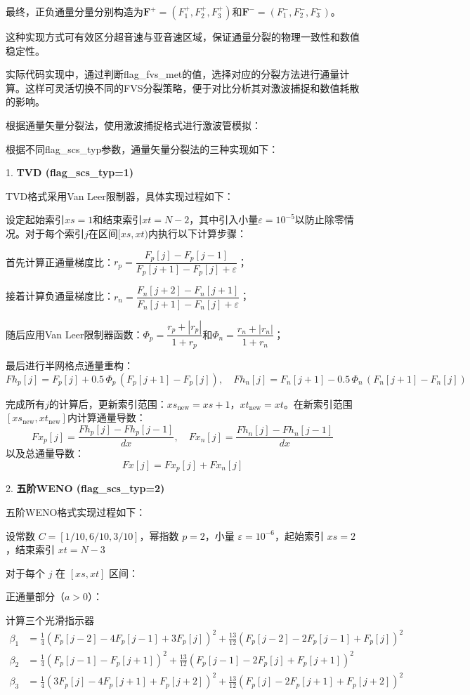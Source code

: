 \documentclass[12pt,a4paper]{article}
\begin{document}
最终，正负通量分量分别构造为$\mathbf{F}^+ = (F_1^+, F_2^+, F_3^+)$和$\mathbf{F}^- = (F_1^-, F_2^-, F_3^-)$。

    这种实现方式可有效区分超音速与亚音速区域，保证通量分裂的物理一致性和数值稳定性。

实际代码实现中，通过判断flag\_fvs\_met的值，选择对应的分裂方法进行通量计算。这样可灵活切换不同的FVS分裂策略，便于对比分析其对激波捕捉和数值耗散的影响。

根据通量矢量分裂法，使用激波捕捉格式进行激波管模拟：

根据不同flag\_scs\_typ参数，通量矢量分裂法的三种实现如下：

1. \textbf{TVD (flag\_scs\_typ=1)}

TVD格式采用Van Leer限制器，具体实现过程如下：

设定起始索引$xs=1$和结束索引$xt=N-2$，其中引入小量$\varepsilon=10^{-5}$以防止除零情况。对于每个索引$j$在区间$[xs, xt)$内执行以下计算步骤：

首先计算正通量梯度比：$r_p = \dfrac{F_p[j] - F_p[j-1]}{F_p[j+1] - F_p[j] + \varepsilon}$；

接着计算负通量梯度比：$r_n = \dfrac{F_n[j+2] - F_n[j+1]}{F_n[j+1] - F_n[j] + \varepsilon}$；

随后应用Van Leer限制器函数：$\Phi_p = \dfrac{r_p + |r_p|}{1 + r_p}$和$\Phi_n = \dfrac{r_n + |r_n|}{1 + r_n}$；

最后进行半网格点通量重构：
$$
Fh_p[j] = F_p[j] + 0.5\,\Phi_p\,(F_p[j+1] - F_p[j]), \quad
Fh_n[j] = F_n[j+1] - 0.5\,\Phi_n\,(F_n[j+1] - F_n[j])
$$

完成所有$j$的计算后，更新索引范围：$xs_{\text{new}} = xs + 1$，$xt_{\text{new}} = xt$。在新索引范围$[xs_{\text{new}}, xt_{\text{new}}]$内计算通量导数：
$$
Fx_p[j] = \frac{Fh_p[j] - Fh_p[j-1]}{dx}, \quad
Fx_n[j] = \frac{Fh_n[j] - Fh_n[j-1]}{dx}
$$
以及总通量导数：
$$
Fx[j] = Fx_p[j] + Fx_n[j]
$$


2. \textbf{五阶WENO (flag\_scs\_typ=2)}

五阶WENO格式实现过程如下：

设常数 $C = [1/10, 6/10, 3/10]$，幂指数 $p=2$，小量 $\varepsilon=10^{-6}$，起始索引 $xs=2$，结束索引 $xt=N-3$

对于每个 $j$ 在 $[xs, xt]$ 区间：

正通量部分（$a>0$）：

计算三个光滑指示器
\begin{align*}
    \beta_1 &= \frac{1}{4}(F_p[j-2] - 4F_p[j-1] + 3F_p[j])^2 + \frac{13}{12}(F_p[j-2] - 2F_p[j-1] + F_p[j])^2 \\
    \beta_2 &= \frac{1}{4}(F_p[j-1] - F_p[j+1])^2 + \frac{13}{12}(F_p[j-1] - 2F_p[j] + F_p[j+1])^2 \\
    \beta_3 &= \frac{1}{4}(3F_p[j] - 4F_p[j+1] + F_p[j+2])^2 + \frac{13}{12}(F_p[j] - 2F_p[j+1] + F_p[j+2])^2
\end{align*}
\end{document}
